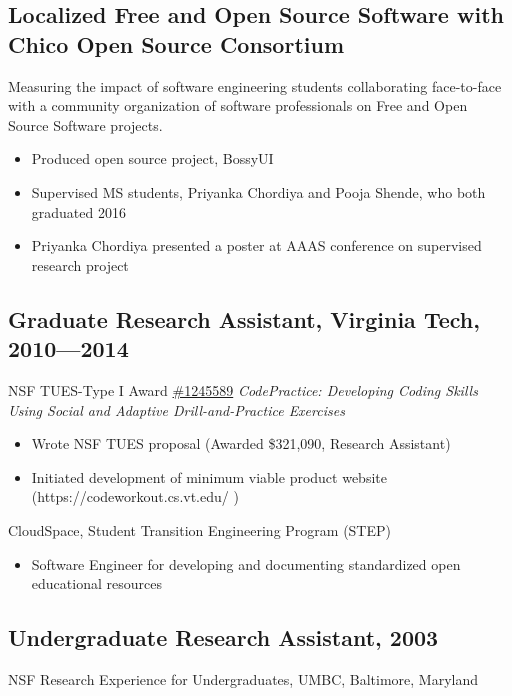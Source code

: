 \documentclass[10pt,letterpaper]{article}
\begin{document}
\subsection*{Localized Free and Open Source Software with Chico Open Source Consortium}
Measuring the impact of software engineering students collaborating face-to-face with a community organization of software professionals on Free and Open Source Software projects.
\begin{itemize}[leftmargin=1.5em]
\item Produced open source project, BossyUI
\item Supervised MS students, Priyanka Chordiya and Pooja Shende, who both graduated 2016
\item Priyanka Chordiya presented a poster at AAAS conference on supervised research project
\end{itemize}
\subsection*{Graduate Research Assistant, Virginia Tech, 2010---2014}
NSF TUES-Type I Award \href{https://www.nsf.gov/awardsearch/show-award/?AWD_ID=1245589}{\#1245589} \textit{CodePractice: Developing Coding Skills Using Social and Adaptive Drill-and-Practice Exercises}\par
\begin{itemize}[leftmargin=1.5em]
  \item Wrote NSF TUES proposal (Awarded \$321,090, Research Assistant)
  \item Initiated development of minimum viable product website (https://codeworkout.cs.vt.edu/ )
\end{itemize}
\par CloudSpace, Student Transition Engineering Program (STEP)
\begin{itemize}[leftmargin=1.5em]
  \item Software Engineer for developing and documenting standardized open educational resources
\end{itemize}
\subsection*{Undergraduate Research Assistant, 2003}
NSF Research Experience for Undergraduates, UMBC, Baltimore, Maryland
\end{document}
